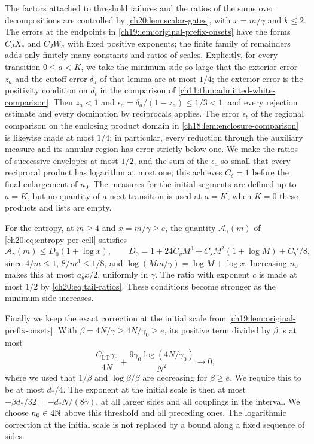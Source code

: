 The factors attached to threshold failures and the ratios of the sums over decompositions are controlled by \cref{ch20:lem:scalar-gates}, with $x=m/\gamma$ and $k\le2$. The errors at the endpoints in \cref{ch19:lem:original-prefix-onsets} have the forms $C_JX_c$ and $C_JW_a$ with fixed positive exponents; the finite family of remainders adds only finitely many constants and ratios of scales. Explicitly, for every transition $0\le a<K$, we take the minimum side so large that the exterior error $z_a$ and the cutoff error $\delta_a$ of that lemma are at most $1/4$; the exterior error is the positivity condition on $d_t$ in the comparison of \cref{ch11:thm:admitted-white-comparison}. Then $z_a<1$ and $\epsilon_a=\delta_a/(1-z_a)\le1/3<1$, and every rejection estimate and every domination by reciprocals applies. The error $\epsilon_t$ of the regional comparison on the enclosing product domain in \cref{ch18:lem:enclosure-comparison} is likewise made at most $1/4$; in particular, every reduction through the auxiliary measure and its annular region has error strictly below one. We make the ratios of successive envelopes at most $1/2$, and the sum of the $\epsilon_a$ so small that every reciprocal product has logarithm at most one; this achieves $C_\delta=1$ before the final enlargement of $n_0$. The measures for the initial segments are defined up to $a=K$, but no quantity of a next transition is used at $a=K$; when $K=0$ these products and lists are empty.

For the entropy, at $m\ge4$ and $x=m/\gamma\ge e$, the quantity $\mathcal A_\gamma(m)$ of \eqref{ch20:eq:entropy-per-cell} satisfies
\[
 \mathcal A_\gamma(m)\le D_0(1+\log x),\qquad D_0=1+24C_vM^3+C_sM^2(1+\log M)+C_b'/8,
\]
since $4/m\le1$, $8/m^3\le1/8$, and $\log(Mm/\gamma)=\log M+\log x$. Increasing $n_0$ makes this at most $a_bx/2$, uniformly in $\gamma$. The ratio with exponent $\bar c$ is made at most $1/2$ by \eqref{ch20:eq:tail-ratios}. These conditions become stronger as the minimum side increases.

Finally we keep the exact correction at the initial scale from \cref{ch19:lem:original-prefix-onsets}. With $\beta=4N/\gamma\ge4N/\gamma_0\ge e$, its positive term divided by $\beta$ is at most
\[
 \frac{C_{\mathrm{LT}}\gamma_0}{4N}+\frac{9\gamma_0\log(4N/\gamma_0)}{N^2}\longrightarrow0,
\]
where we used that $1/\beta$ and $\log\beta/\beta$ are decreasing for $\beta\ge e$. We require this to be at most $d_*/4$. The exponent at the initial scale is then at most $-\beta d_*/32=-d_*N/(8\gamma)$, at all larger sides and all couplings in the interval. We choose $n_0\in4\mathbb N$ above this threshold and all preceding ones. The logarithmic correction at the initial scale is not replaced by a bound along a fixed sequence of sides.

